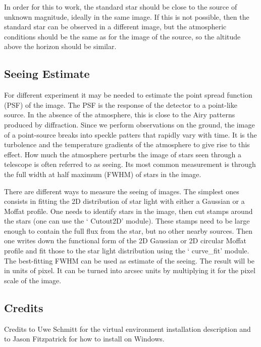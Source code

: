 \documentclass[a4paper, 11pt, fleqn]{memoir}
\begin{document}
In order for this to work, the standard star should be close to the source of unknown magnitude, ideally in the same image.
If this is not possible, then the standard star can be observed in a different image, but the atmospheric conditions should be the same as for the image of the source, so the altitude above the horizon should be similar.



\subsection{Seeing Estimate}

For different experiment it may be needed to estimate the point spread function (PSF) of the image.
The PSF is the response of the detector to a point-like source.
In the absence of the atmosphere, this is close to the Airy patterns produced by diffraction.
Since we perform observations on the ground, the image of a point-source breaks into speckle patters that rapidly vary with time.
It is the turbolence and the temperature gradients of the atmosphere to give rise to this effect.
How much the atmosphere perturbs the image of stars seen through a telescope is often referred to as seeing.
Its most common measurement is through the full width at half maximum (FWHM) of stars in the image.

There are different ways to measure the seeing of images.
The simplest ones consists in fitting the 2D distribution of star light with either a Gaussian or a Moffat profile.
One needs to identify stars in the image, then cut stamps around the stars (one can use the ` Cutout2D'  module).
These stamps need to be large enough to contain the full flux from the star, but no other nearby sources.
Then one writes down the functional form of the 2D Gaussian or 2D circular Moffat profile and fit those to the star light distribution using the ` curve\_fit'  module.
The best-fitting FWHM can be used as estimate of the seeing.
The result will be in units of pixel.
It can be turned into arcsec units by multiplying it for the pixel scale of the image.

\subsection{Credits}

Credits to Uwe Schmitt for the virtual environment installation description and to Jason Fitzpatrick for how to install  on Windows.
\end{document}
